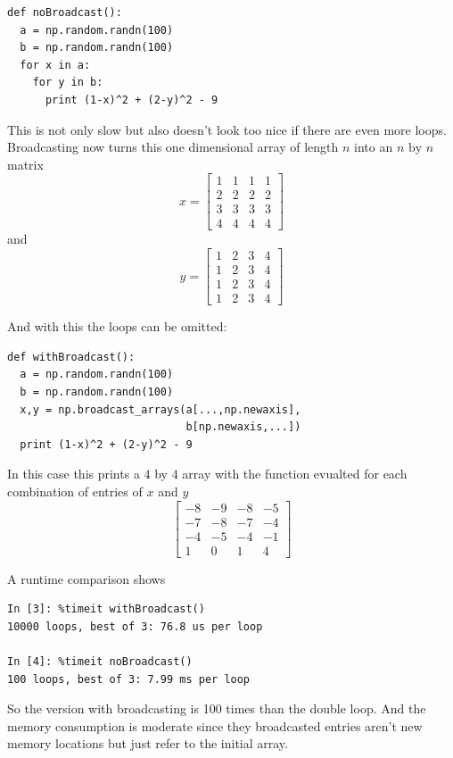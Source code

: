 \documentclass[11pt,twoside]{scrreprt}
\begin{document}
\noindent\begin{minipage}{\linewidth}
\begin{lstlisting}
def noBroadcast():
  a = np.random.randn(100)
  b = np.random.randn(100) 
  for x in a:
    for y in b:
      print (1-x)^2 + (2-y)^2 - 9
\end{lstlisting}  
\end{minipage}
%
This is not only slow but also doesn't look too nice if there are even more loops.
Broadcasting now turns this one dimensional array of length $n$ into an $n\text{ by }n$ matrix
\[
  x = \begin{bmatrix}
  1 & 1 & 1 & 1 \\
  2 & 2 & 2 & 2 \\
  3 & 3 & 3 & 3\\
  4 & 4 & 4 & 4
  \end{bmatrix}
\]
and
\[
  y = \begin{bmatrix}
  1 & 2 & 3 & 4 \\
  1 & 2 & 3 & 4 \\
  1 & 2 & 3 & 4 \\
  1 & 2 & 3 & 4 
\end{bmatrix}
\]
\noindent\begin{minipage}{\linewidth}
And with this the loops can be omitted:
\begin{lstlisting}
def withBroadcast():
  a = np.random.randn(100)
  b = np.random.randn(100) 
  x,y = np.broadcast_arrays(a[...,np.newaxis],
                            b[np.newaxis,...])
  print (1-x)^2 + (2-y)^2 - 9
\end{lstlisting}  
\end{minipage}
In this case this prints a $4$ by $4$ array with the function evualted for each combination of entries of $x$ and $y$
\[
  \begin{bmatrix}
    -8& -9& -8& -5\\
    -7& -8& -7& -4\\
    -4& -5& -4& -1\\
     1&  0&  1&  4
       \end{bmatrix}
\]
%
\begin{minipage}{\linewidth}
A runtime comparison shows   
\begin{lstlisting}
In [3]: %timeit withBroadcast()
10000 loops, best of 3: 76.8 us per loop

In [4]: %timeit noBroadcast()
100 loops, best of 3: 7.99 ms per loop
\end{lstlisting}
So the version with broadcasting is 100 times than the double loop. And the memory consumption is moderate since they broadcasted entries aren't new memory locations but just refer to the initial array.
\end{minipage}
\end{document}
